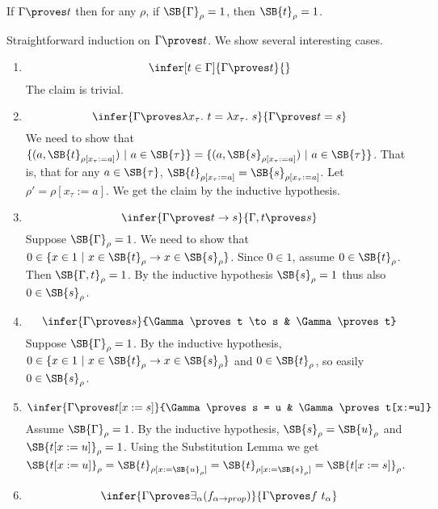 \documentclass{LMCS}
\newcommand\rimpl{\ensuremath{\to}}
\newcommand{\ignore}[1]{}
\newcommand{\p}{\proves}
\newcommand{\g}{\Gamma}
\newcommand{\gp}{\Gamma \proves}
\newcommand{\sr}[1]{\SB{#1}_\rho}
\begin{document}
\begin{thm}[Soundness]
If $\g \p t$ then for any $\rho$, if $\SB{\g}_\rho = 1$, then $\sr{t} = 1$.
\end{thm}
\proof
Straightforward induction on $\gp t$. We show several interesting cases. 
\begin{enumerate}[$\bullet$]
\item 
\[
\infer[t \in \g]{\gp t}{}
\]
The claim is trivial.
\item 
\[
\infer{\gp \lambda x_\tau.\ t = \lambda x_\tau.\ s}{\gp t = s}
\]
We need to show that $\{ (a, \SB{t}_{\rho[x_\tau:=a]})\ |\ a \in \SB{\tau} \} =
\{ (a, \SB{s}_{\rho[x_\tau:=a]})\ |\ a \in \SB{\tau} \}$. That is, that for any $a
\in \SB{\tau}$, $\SB{t}_{\rho[x_\tau:=a]} = \SB{s}_{\rho[x_\tau:=a]}$. Let $\rho' =
\rho[x_\tau:=a]$. We get the claim by the inductive hypothesis. 
\ignore{
\item  
\[
\infer{\gp t \land s}{\gp t & \gp s}
\]
Suppose $\sr{\g} = 1$. By IH, $0 \in \sr{t}$ and $0 \in \sr{s}$, so $0 \in
\sr{t} \cap \sr{s}$. 
\item
\[
\infer{\gp t}{\gp t \land s} \qquad \infer{\gp s}{\gp t \land s}
\]
Reverse the previous case to get the claims.
}
\ignore
{
\item 
\[
\infer{\gp t \lor s}{\gp t} \qquad \infer{\gp t \lor s}{\gp s} \qquad \infer{\gp u}{\gp t \lor s & \g, t \p u & \g, s \p u}
\]
The first two cases are easy. For the last one, suppose $\sr{\g} = 1$. By
IH, we know that $0 \in \sr{t} \cup \sr{s}$, so either $0 \in \sr{t}$ or $0
\in \sr{s}$. In both cases, by the rest of IH, $0 \in \sr{u}$, so we get the
claim.
}	
\item 
\[
\infer{\g \p t \rimpl s}{\g, t \p s}
\]
Suppose $\SB{\g}_\rho = 1$. We need to show that $0 \in \{ x \in 1\ |\
x \in \SB{t}_\rho \to x \in \sr{s} \}$. Since $0 \in 1$, assume $0 \in
\sr{t}$. Then $\SB{\g, t}_\rho = 1$. By the inductive hypothesis
$\sr{s} = 1$ thus also $0 \in \sr{s}$. 
\item 
\[
\infer{\gp s}{\gp t \to s & \gp t}
\]
Suppose $\sr{\g} = 1$. By the inductive hypothesis, $0 \in \{ x \in 1\ |\ x \in
\sr{t} \to x \in \sr{s} \}$ and $0 \in \sr{t}$, so easily $0 \in \sr{s}$.
\item 
\[
\infer{\gp t[x:=s]}{\gp s = u & \gp t[x:=u]}
\]
Assume $\sr{\g} = 1$. By the inductive hypothesis, $\sr{s} = \sr{u}$ and $\sr{t[x:=u]} = 1$. 
Using the Substitution Lemma we get $\sr{t[x:=u]} = \SB{t}_{\rho[x:=\sr{u}]} =
\SB{t}_{\rho[x:=\sr{s}]} = \sr{t[x:=s]}$.
\item 
\[
\infer{\gp \exists_\alpha(f_{\alpha \to prop})}{\gp f\ t_\alpha}
\]
\end{enumerate}
\end{document}
